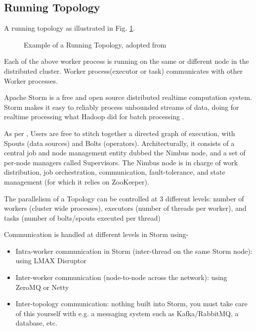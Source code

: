 \documentclass[9pt,twocolumn,twoside]{../../styles/osajnl}
\begin{document}
\subsection{Running Topology}
A running topology as illustrated in
Fig. \ref{fig:Storm_example_of_a_running_topology}.

\begin{figure}[htbp]
	\centering
	\caption{Example of a Running Topology, adopted from
	\cite{www-noll2012-parallelismofstormtopology} }
	\label{fig:Storm_example_of_a_running_topology}
\end{figure}


Each of the above worker process is running on the same or different
node in the distributed cluster. Worker process(executor or task)
communicates with other Worker processes.

Apache Storm is a free and open source distributed realtime
computation system. Storm makes it easy to reliably process unbounded
streams of data, doing for realtime processing what Hadoop did for
batch processing \cite{www-storm}.

As per \cite{article-nabi2014streams}, Users are free to stitch
together a directed graph of execution, with Spouts (data sources) and
Bolts (operators). Architecturally, it consists of a central job and
node management entity dubbed the Nimbus node, and a set of per-node
managers called Supervisors. The Nimbus node is in charge of work
distribution, job orchestration, communication, fault-tolerance, and
state management (for which it relies on ZooKeeper).

The parallelism of a Topology can be controlled at 3 different levels:
number of workers (cluster wide processes), executors (number of
threads per worker), and tasks (number of bolts/spouts executed per
thread)

Communication is handled at different levels in Storm using-
\begin{itemize}
  \renewcommand{\labelitemi}{\scriptsize$\square$}
        \item Intra-worker communication in Storm (inter-thread on the
          same Storm node): using LMAX Disruptor
        \item Inter-worker communication (node-to-node across
          the network): using ZeroMQ or Netty
        \item Inter-topology communication: nothing
built into Storm, you must take care of this yourself with e.g. a
messaging system such as Kafka/RabbitMQ, a database, etc.
\end{itemize}
\end{document}
